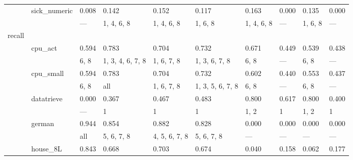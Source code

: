 \documentclass{article}
\begin{document}
\begin{center}
\begin{longtable}{p{1.2cm}p{1.8cm}p{1cm}p{1cm}p{1cm}p{1cm}p{1cm}p{1cm}p{1cm}p{1cm}}
             & sick\_numeric & 0.008         & 0.142            & 0.152            & 0.117            & 0.163            & 0.000            & 0.135            & 0.000            \\
             &              & ---           & 1, 4, 6, 8       & 1, 4, 6, 8       & 1, 6, 8          & 1, 4, 6, 8       & ---              & 1, 6, 8          & ---              \\
 recall      &              &               &                  &                  &                  &                  &                  &                  &                  \\
             & cpu\_act      & 0.594         & 0.783            & 0.704            & 0.732            & 0.671            & 0.449            & 0.539            & 0.438            \\
             &              & 6, 8          & 1, 3, 4, 6, 7, 8 & 1, 6, 7, 8       & 1, 3, 6, 7, 8    & 6, 8             & ---              & 6, 8             & ---              \\
             & cpu\_small    & 0.594         & 0.783            & 0.704            & 0.732            & 0.602            & 0.440            & 0.553            & 0.437            \\
             &              & 6, 8          & all              & 1, 6, 7, 8       & 1, 3, 5, 6, 7, 8 & 6, 8             & ---              & 6, 8             & ---              \\
             & datatrieve   & 0.000         & 0.367            & 0.467            & 0.483            & 0.800            & 0.617            & 0.800            & 0.400            \\
             &              & ---           & 1                & 1                & 1                & 1, 2             & 1                & 1, 2             & 1                \\
             & german       & 0.944         & 0.854            & 0.882            & 0.828            & 0.000            & 0.000            & 0.000            & 0.000            \\
             &              & all           & 5, 6, 7, 8       & 4, 5, 6, 7, 8    & 5, 6, 7, 8       & ---              & ---              & ---              & ---              \\
             & house\_8L     & 0.843         & 0.668            & 0.703            & 0.674            & 0.040            & 0.158            & 0.062            & 0.177            \\

\end{longtable}
\end{center}
\end{document}
